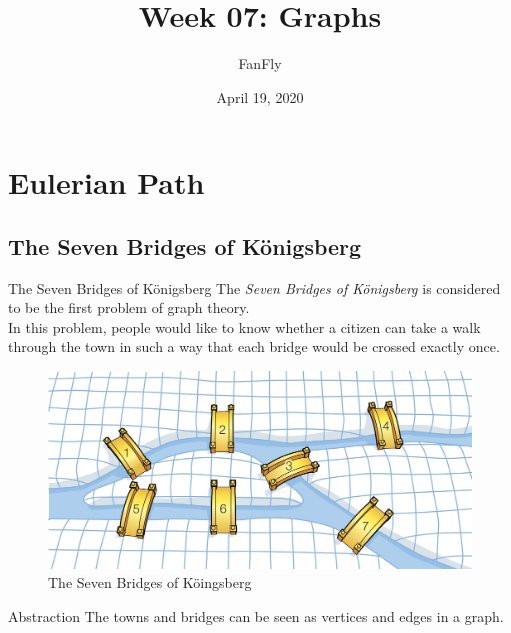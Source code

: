 \documentclass{beamer}
\title{Week 07: Graphs}
\author{FanFly}
\date{April 19, 2020}
\begin{document}
\begin{frame}
  \titlepage
\end{frame}

\section{Eulerian Path}
\subsection{The Seven Bridges of K\"onigsberg}
\begin{frame}{The Seven Bridges of K\"onigsberg}
  The \emph{Seven Bridges of K\"onigsberg} is considered to be the first
  problem of graph theory. \pause \\[.5em]
  In this problem, people would like to know whether a citizen can take a walk
  through the town in such a way that each bridge would be crossed exactly
  once.
  \begin{figure}
    \includegraphics[scale=0.15]{bridges.jpg}
    \caption{The Seven Bridges of K\"oingsberg}
  \end{figure}
\end{frame}

\begin{frame}{Abstraction}
  The towns and bridges can be seen as vertices and edges in a graph.
  \begin{figure}
  \end{figure}
\end{frame}
\end{document}
